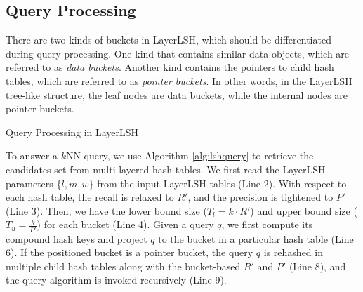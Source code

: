 \subsection{Query Processing}
\label{sec:layerlsh:query}

There are two kinds of buckets in LayerLSH, which should be differentiated during query processing. One kind that contains similar data objects, which are referred to as \emph{data buckets}. Another kind contains the pointers to child hash tables, which are referred to as \emph{pointer buckets}. In other words, in the LayerLSH tree-like structure, the leaf nodes are data buckets, while the internal nodes are pointer buckets.

\begin{algorithm}[t]
\SetNoFillComment
{}

\BlankLine
{}
\caption{Query Processing in LayerLSH}
\label{alg:lshquery}
\end{algorithm}

To answer a $k$NN query, we use Algorithm \ref{alg:lshquery} to retrieve the candidates set from multi-layered hash tables. We first read the LayerLSH parameters $\{l,m,w\}$ from the input LayerLSH tables (Line 2). With respect to each hash table, the recall is relaxed to $R'$, and the precision is tightened to $P'$ (Line 3). Then, we have the lower bound size ($T_l=k\cdot R'$) and upper bound size ($T_u=\frac{k}{P'}$) for each bucket (Line 4). Given a query $q$, we first compute its compound hash keys and project $q$ to the bucket in a particular hash table (Line 6). If the positioned bucket is a pointer bucket, the query $q$ is rehashed in multiple child hash tables along with the bucket-based $R'$ and $P'$ (Line 8), and the query algorithm is invoked recursively (Line 9).



